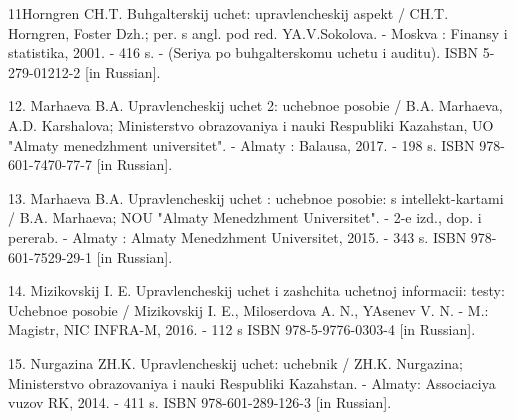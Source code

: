 \begin{references}
11Horngren CH.T. Buhgalterskij uchet: upravlencheskij aspekt / CH.T.
Horngren, Foster Dzh.; per. s angl. pod red. YA.V.Sokolova. - Moskva :
Finansy i statistika, 2001. - 416 s. - (Seriya po buhgalterskomu uchetu
i auditu). ISBN 5-279-01212-2 {[}in Russian{]}.

12. Marhaeva B.A. Upravlencheskij uchet 2: uchebnoe posobie / B.A.
Marhaeva, A.D. Karshalova; Ministerstvo obrazovaniya i nauki Respubliki
Kazahstan, UO "Almaty menedzhment universitet". - Almaty : Balausa,
2017. - 198 s. ISBN 978-601-7470-77-7 {[}in Russian{]}.

13. Marhaeva B.A. Upravlencheskij uchet : uchebnoe posobie: s
intellekt-kartami / B.A. Marhaeva; NOU "Almaty Menedzhment Universitet".
- 2-e izd., dop. i pererab. - Almaty : Almaty Menedzhment Universitet,
2015. - 343 s. ISBN 978-601-7529-29-1 {[}in Russian{]}.

14. Mizikovskij I. E. Upravlencheskij uchet i zashchita uchetnoj
informacii: testy: Uchebnoe posobie / Mizikovskij I. E., Miloserdova A.
N., YAsenev V. N. - M.: Magistr, NIC INFRA-M, 2016. - 112 s ISBN
978-5-9776-0303-4 {[}in Russian{]}.

15. Nurgazina ZH.K. Upravlencheskij uchet: uchebnik / ZH.K. Nurgazina;
Ministerstvo obrazovaniya i nauki Respubliki Kazahstan. - Almaty:
Associaciya vuzov RK, 2014. - 411 s. ISBN 978-601-289-126-3 {[}in
Russian{]}.
\end{references}


